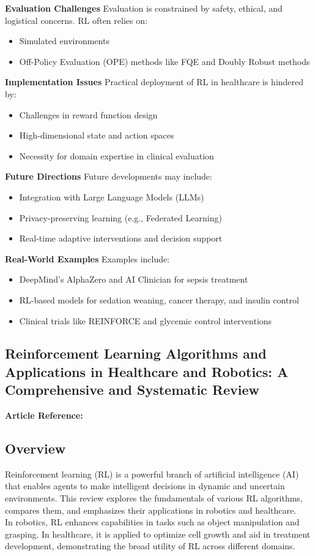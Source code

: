 \textbf{Evaluation Challenges}
Evaluation is constrained by safety, ethical, and logistical concerns. RL often relies on: \begin{itemize} \item Simulated environments \item Off-Policy Evaluation (OPE) methods like FQE and Doubly Robust methods \end{itemize}

\textbf{Implementation Issues}
Practical deployment of RL in healthcare is hindered by: \begin{itemize} \item Challenges in reward function design \item High-dimensional state and action spaces \item Necessity for domain expertise in clinical evaluation \end{itemize}

\textbf{Future Directions}
Future developments may include: \begin{itemize} \item Integration with Large Language Models (LLMs) \item Privacy-preserving learning (e.g., Federated Learning) \item Real-time adaptive interventions and decision support \end{itemize}

\textbf{Real-World Examples}
Examples include: \begin{itemize} \item DeepMind’s AlphaZero and AI Clinician for sepsis treatment \item RL-based models for sedation weaning, cancer therapy, and insulin control \item Clinical trials like REINFORCE and glycemic control interventions \end{itemize}
\newpage
\subsection{Reinforcement Learning Algorithms and Applications in Healthcare and Robotics: A Comprehensive and Systematic Review}
\textbf{Article Reference:} \cite{article_2}

\subsection*{Overview}
Reinforcement learning (RL) is a powerful branch of artificial intelligence (AI) that enables agents to make intelligent decisions in dynamic and uncertain environments. This review explores the fundamentals of various RL algorithms, compares them, and emphasizes their applications in robotics and healthcare.\\
In robotics, RL enhances capabilities in tasks such as object manipulation and grasping. In healthcare, it is applied to optimize cell growth and aid in treatment development, demonstrating the broad utility of RL across different domains.

